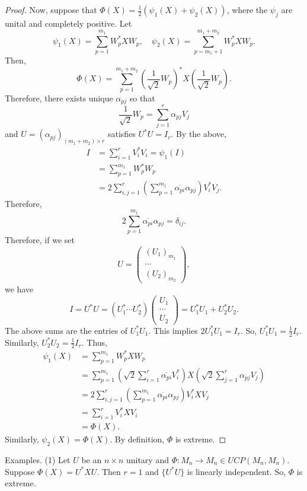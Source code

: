 \documentclass[12pt]{article}
\theoremstyle{definition}
\begin{document}
\begin{proof}
Now, suppose that $\Phi(X)=\frac{1}{2}(\psi_1(X)+\psi_2(X))$, where the $\psi_j$ are unital and completely positive. Let
\[
\psi_1(X) = \sum_{p=1}^{m_1} W_p^*XW_p, \quad \psi_2(X) = \sum_{p=m_1+1}^{m_1+m_2} W_p^*XW_p.
\]
Then,
\[
\Phi(X) = \sum_{p=1}^{m_1+m_2} \left(\frac{1}{\sqrt{2}}W_p\right)^*X\left(\frac{1}{\sqrt{2}}W_p\right).
\]
Therefore, there exists unique $\alpha_{pj}$ so that
\[
\frac{1}{\sqrt{2}}W_p = \sum_{j=1}^r \alpha_{pj}V_j
\]
and $U=(\alpha_{pj})_{(m_1+m_2)\times r}$ satisfies $U^*U=I_r$.
By the above,
\begin{align*}
I &= \sum_{i=1}^r V_i^*V_i = \psi_1(I) \\
&= \sum_{p=1}^{m_1} W_p^*W_p \\
&= 2\sum_{i,j=1}^r \left(\sum_{p=1}^{m_1} \overline{\alpha_{pi}}\alpha_{pj}\right)V_i^*V_j.
\end{align*}
Therefore,
\[
2\sum_{p=1}^{m_1} \overline{\alpha_{pi}}\alpha_{pj} = \delta_{ij}.
\]
Therefore, if we set
\[
U = \begin{pmatrix}(U_1)_{m_1}\\ \cdots \\ (U_2)_{m_2}\end{pmatrix},
\]
we have
\[
I = U^*U = (U_1^*\cdots U_2^*)\begin{pmatrix}U_1\\ \cdots \\ U_2\end{pmatrix} = U_1^*U_1 + U_2^*U_2.
\]
The above sums are the entries of $U_1^*U_1$. This implies $2U_1^*U_1=I_r$. So, $U_1^*U_1=\frac{1}{2}I_r$. Similarly, $U_2^*U_2=\frac{1}{2}I_r$. Thus,
\begin{align*}
\psi_1(X) &= \sum_{p=1}^{m_1} W_p^*XW_p \\
&= \sum_{p=1}^{m_1} \left(\sqrt{2}\sum_{i=1}^r \overline{\alpha_{pi}}V_i^*\right)X\left(\sqrt{2}\sum_{j=1}^r \alpha_{pj}V_j\right) \\
&= 2\sum_{i,j=1}^r \left(\sum_{p=1}^{m_1} \overline{\alpha_{pi}}\alpha_{pj}\right)V_i^*XV_j \\
&= \sum_{i=1}^r V_i^*XV_i \\
&= \Phi(X).
\end{align*}
Similarly, $\psi_2(X)=\Phi(X)$. By definition, $\Phi$ is extreme.
\end{proof}

Examples. (1) Let $U$ be an $n \times n$ unitary and $\Phi : M_n \to M_n \in UCP(M_n,M_n)$. Suppose $\Phi(X)=U^*XU$. Then $r=1$ and $\{U^*U\}$ is linearly independent. So, $\Phi$ is extreme.
\end{document}
